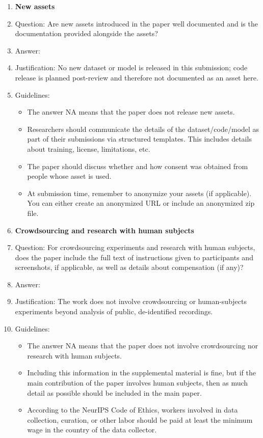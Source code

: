 \documentclass{article}
\begin{document}
\begin{enumerate}
\item {\bf New assets}
    \item[] Question: Are new assets introduced in the paper well documented and is the documentation provided alongside the assets?
    \item[] Answer: \answerNA{}
    \item[] Justification: No new dataset or model is released in this submission; code release is planned post-review and therefore not documented as an asset here.
    \item[] Guidelines:
    \begin{itemize}
        \item The answer NA means that the paper does not release new assets.
        \item Researchers should communicate the details of the dataset/code/model as part of their submissions via structured templates. This includes details about training, license, limitations, etc. 
        \item The paper should discuss whether and how consent was obtained from people whose asset is used.
        \item At submission time, remember to anonymize your assets (if applicable). You can either create an anonymized URL or include an anonymized zip file.
    \end{itemize}

\item {\bf Crowdsourcing and research with human subjects}
    \item[] Question: For crowdsourcing experiments and research with human subjects, does the paper include the full text of instructions given to participants and screenshots, if applicable, as well as details about compensation (if any)? 
    \item[] Answer: \answerNA{}
    \item[] Justification: The work does not involve crowdsourcing or human-subjects experiments beyond analysis of public, de-identified recordings.
    \item[] Guidelines:
    \begin{itemize}
        \item The answer NA means that the paper does not involve crowdsourcing nor research with human subjects.
        \item Including this information in the supplemental material is fine, but if the main contribution of the paper involves human subjects, then as much detail as possible should be included in the main paper. 
        \item According to the NeurIPS Code of Ethics, workers involved in data collection, curation, or other labor should be paid at least the minimum wage in the country of the data collector. 
    \end{itemize}


\end{enumerate}
\end{document}
